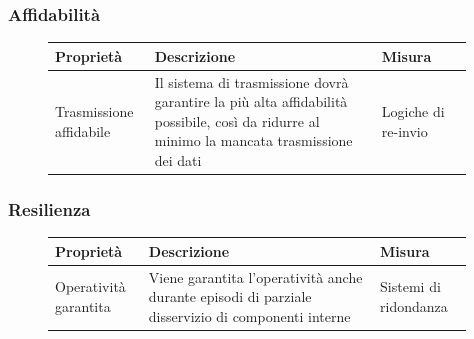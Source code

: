 \documentclass{article}
\begin{document}
\subsubsection{Affidabilità}\label{rnf_4}
\begin{description}
	\item[]
	    
	\begin{table}[!htbp]
		\begin{tabular} {|>{\raggedright\arraybackslash}m{0.20\linewidth} | >{\raggedright\arraybackslash}m{0.50\linewidth}|>{\raggedright\arraybackslash}m{0.20\linewidth}|}
			\hline
			\textbf{Proprietà}                                                                                                                           &   
			\textbf{Descrizione}                                                                                                                          &   
			\textbf{Misura} \\ \hline
			Trasmissione affidabile                                                                                                                       &   
			Il sistema di trasmissione dovrà garantire la più alta affidabilità possibile, così da ridurre al minimo la mancata trasmissione dei dati &   
			Logiche di re-invio \\ \hline
		\end{tabular}
	\end{table}
\end{description}

\subsubsection{Resilienza}\label{rnf_5}
\begin{description}
	\item[]
	    
	\begin{table}[!htbp]
		\begin{tabular} {|>{\raggedright\arraybackslash}m{0.20\linewidth} | >{\raggedright\arraybackslash}m{0.50\linewidth}|>{\raggedright\arraybackslash}m{0.20\linewidth}|}
			\hline
			\textbf{Proprietà}    & \textbf{Descrizione}                                                                                 & \textbf{Misura}       \\ \hline
			Operatività garantita & Viene garantita l’operatività anche durante episodi di parziale disservizio di componenti interne & Sistemi di ridondanza \\ \hline
		\end{tabular}
	\end{table}
	    
\end{description}
\end{document}
